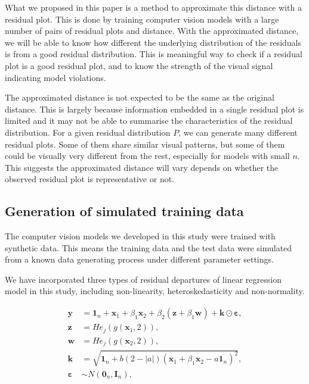 \documentclass[]{interact}
\theoremstyle{plain}%
\theoremstyle{definition}
\theoremstyle{remark}
\begin{document}
What we proposed in this paper is a method to approximate this distance
with a residual plot. This is done by training computer vision models
with a large number of pairs of residual plots and distance. With the
approximated distance, we will be able to know how different the
underlying distribution of the residuals is from a good residual
distribution. This is meaningful way to check if a residual plot is a
good residual plot, and to know the strength of the visual signal
indicating model violations.

The approximated distance is not expected to be the same as the original
distance. This is largely because information embedded in a single
residual plot is limited and it may not be able to summarise the
characteristics of the residual distribution. For a given residual
distribution \(P\), we can generate many different residual plots. Some
of them share similar visual patterns, but some of them could be
visually very different from the rest, especially for models with small
\(n\). This suggests the approximated distance will vary depends on
whether the observed residual plot is representative or not.

\hypertarget{generation-of-simulated-training-data}{%
\subsection{Generation of simulated training
data}\label{generation-of-simulated-training-data}}

The computer vision models we developed in this study were trained with
synthetic data. This means the training data and the test data were
simulated from a known data generating process under different parameter
settings.

We have incorporated three types of residual departures of linear
regression model in this study, including non-linearity,
heteroskedasticity and non-normality.

\begin{align*}
\boldsymbol{y} &= \boldsymbol{1}_n + \boldsymbol{x}_1 + \beta_1\boldsymbol{x}_2 + \beta_2(\boldsymbol{z} + \beta_1\boldsymbol{w}) + \boldsymbol{k} \odot \boldsymbol{\varepsilon}, \\
\boldsymbol{z} &= He_j(g(\boldsymbol{x}_1, 2)), \\
\boldsymbol{w} &= He_j(g(\boldsymbol{x}_2, 2)), \\
\boldsymbol{k} &= \sqrt{\boldsymbol{1}_n + b(2 - |a|)(\boldsymbol{x}_1 + \beta_1\boldsymbol{x}_2 - a\boldsymbol{1}_n)^2}, \\
\boldsymbol{\varepsilon} &\sim N(\boldsymbol{0}_n, \boldsymbol{I}_n),
\end{align*}
\end{document}
